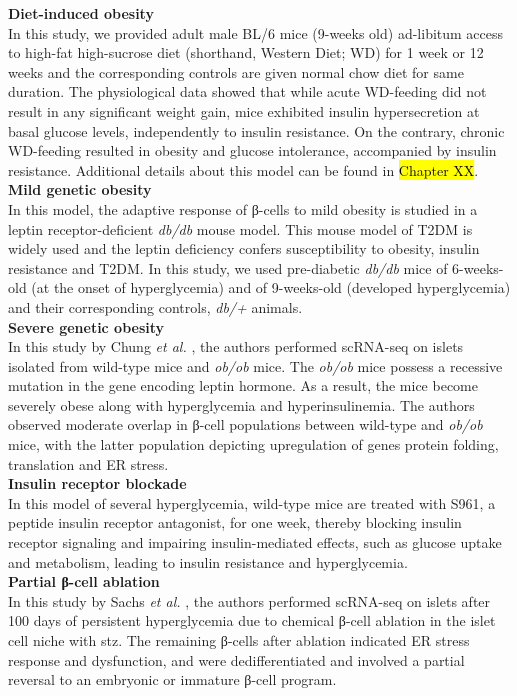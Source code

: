 \textbf{Diet-induced obesity\\}
In this study, we provided adult male BL/6 mice (9-weeks old) ad-libitum access to high-fat high-sucrose diet (shorthand, Western Diet; WD) for 1 week or 12 weeks and the corresponding controls are given normal chow diet for same duration. The physiological data showed that while acute WD-feeding did not result in any significant weight gain, mice exhibited insulin hypersecretion at basal glucose levels, independently to insulin resistance. On the contrary, chronic WD-feeding resulted in obesity and glucose intolerance, accompanied by insulin resistance. Additional details about this model can be found in \hl{Chapter XX}.\\

\textbf{Mild genetic obesity\\}
In this model, the adaptive response of β-cells to mild obesity is studied in a leptin receptor-deficient \textit{db/db} mouse model. This mouse model of T2DM is widely used and the leptin deficiency confers susceptibility to obesity, insulin resistance and T2DM. In this study, we used pre-diabetic \textit{db/db} mice of 6-weeks-old (at the onset of hyperglycemia) and of 9-weeks-old (developed hyperglycemia) and their corresponding controls, \textit{db/+} animals.\\

\textbf{Severe genetic obesity\\}
In this study by Chung \textit{et al.} \textbf{\cite{chung_endocrine-exocrine_2020}}, the authors performed scRNA-seq on islets isolated from wild-type mice and \textit{ob/ob} mice. The \textit{ob/ob} mice possess a recessive mutation in the gene encoding leptin hormone. As a result, the mice become severely obese along with hyperglycemia and hyperinsulinemia. The authors observed moderate overlap in β-cell populations between wild-type and \textit{ob/ob} mice, with the latter population depicting upregulation of genes protein folding, translation and ER stress.\\

\textbf{Insulin receptor blockade\\}
In this model of several hyperglycemia, wild-type mice are treated with S961, a peptide insulin receptor antagonist, for one week, thereby blocking insulin receptor signaling and impairing insulin-mediated effects, such as glucose uptake and metabolism, leading to insulin resistance and hyperglycemia.\\

\textbf{Partial β-cell ablation\\}
In this study by Sachs \textit{et al.} \textbf{\cite{sachs_targeted_2020}}, the authors performed scRNA-seq on islets after 100 days of persistent hyperglycemia due to chemical β-cell ablation in the islet cell niche with \gls{stz}. The remaining β-cells after ablation indicated ER stress response and dysfunction, and were dedifferentiated and involved a partial reversal to an embryonic or immature β-cell program.\\

